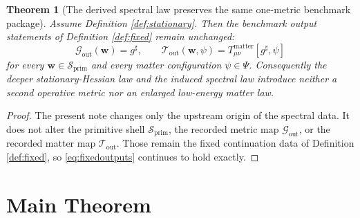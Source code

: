 \documentclass[11pt]{article}
\newcommand{\CompletedMetric}{g^{\sharp}}
\newcommand{\PrimShell}{\mathcal S_{\mathrm{prim}}}
\newcommand{\MetricOut}{\mathscr G_{\mathrm{out}}}
\newcommand{\MatterOut}{\mathscr T_{\mathrm{out}}}
\newtheorem{theorem}{Theorem}
\begin{document}
\begin{theorem}[The derived spectral law preserves the same one-metric benchmark package]
\label{thm:outputs}
Assume Definition \ref{def:stationary}. Then the benchmark output statements of Definition \ref{def:fixed} remain unchanged:
\[
\MetricOut(\mathbf w)=\CompletedMetric,
\qquad
\MatterOut(\mathbf w,\psi)
=
T_{\mu\nu}^{\mathrm{matter}}[\CompletedMetric,\psi]
\]
for every \(\mathbf w\in\PrimShell\) and every matter configuration \(\psi\in\Psi\). Consequently the deeper stationary-Hessian law and the induced spectral law introduce neither a second operative metric nor an enlarged low-energy matter law.
\end{theorem}

\begin{proof}
The present note changes only the upstream origin of the spectral data. It does not alter the primitive shell \(\PrimShell\), the recorded metric map \(\MetricOut\), or the recorded matter map \(\MatterOut\). Those remain the fixed continuation data of Definition \ref{def:fixed}, so \eqref{eq:fixedoutputs} continues to hold exactly.
\end{proof}

\section{Main Theorem}
\end{document}
